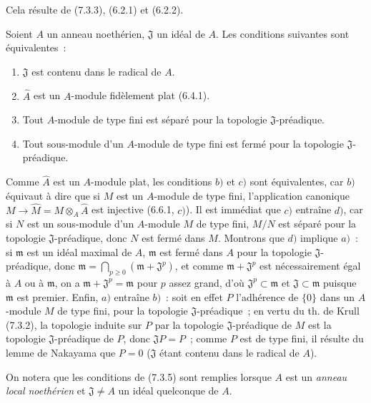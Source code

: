 Cela résulte de (7.3.3), (6.2.1) et (6.2.2).

\begin{corollary}[7.3.5]
\label{0.7.3.5-fr}
Soient $A$ un anneau noethérien, $\mathfrak J$ un idéal de $A$. Les
conditions suivantes sont équivalentes~:
\begin{enumerate}
  \item[$a)$] $\mathfrak J$ est contenu dans le radical de $A$.
  \item[$b)$] $\widehat A$ est un $A$-module fidèlement plat \textup{(6.4.1)}.
  \item[$c)$] Tout $A$-module de type fini est séparé pour la topologie
  $\mathfrak J$-préadique.
  \item[$d)$] Tout sous-module d'un $A$-module de type fini est fermé pour la
  topologie $\mathfrak J$-préadique.
\end{enumerate}
\end{corollary}

Comme $\widehat A$ est un $A$-module plat, les conditions $b)$ et $c)$ sont
équivalentes, car $b)$ équivaut à dire que si $M$ est un $A$-module de type
fini, l'application canonique
$M\to\widehat M=M\otimes_A\widehat A$ est injective (6.6.1, $c)$). Il est
immédiat que $c)$ entraîne $d)$, car si $N$ est un sous-module d'un $A$-module
$M$ de type fini, $M/N$ est séparé pour la topologie $\mathfrak J$-préadique,
donc $N$ est fermé dans $M$. Montrons que $d)$ implique $a)$~: si
$\mathfrak m$ est un idéal maximal de $A$, $\mathfrak m$ est fermé dans $A$
pour la topologie $\mathfrak J$-préadique, donc $\mathfrak m=\bigcap_{p\geq0}(\mathfrak m+\mathfrak J^p)$,
et comme $\mathfrak m+\mathfrak J^p$ est nécessairement égal à $A$ ou à
$\mathfrak m$, on a $\mathfrak m+\mathfrak J^p=\mathfrak m$ pour $p$ assez
grand, d'où $\mathfrak J^p\subset\mathfrak m$ et
$\mathfrak J\subset\mathfrak m$ puisque $\mathfrak m$ est premier. Enfin,
$a)$ entraîne $b)$~: soit en effet $P$ l'adhérence de $\{0\}$ dans un
$A$-module $M$ de type fini, pour la topologie $\mathfrak J$-préadique~; en
vertu du th. de Krull (7.3.2), la topologie induite sur $P$ par la topologie
$\mathfrak J$-préadique de $M$ est la topologie $\mathfrak J$-préadique de
$P$, donc $\mathfrak JP=P$~; comme $P$ est de type fini, il résulte du lemme
de Nakayama que $P=0$ ($\mathfrak J$ étant contenu dans le radical de $A$).

On notera que les conditions de (7.3.5) sont remplies lorsque $A$ est un
\emph{anneau local noethérien} et $\mathfrak J\neq A$ un idéal quelconque de
$A$.

